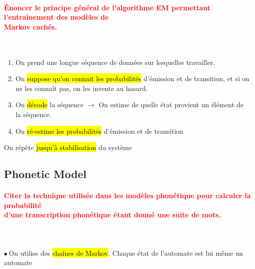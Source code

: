 \documentclass[letterpaper, 12pt]{article}
\newcommand{\alinea}{
\hspace*{0.3cm}}
\newcommand{\red}[1]{
	\textcolor{red}{#1}
}
\newcommand{\point}{$\bullet\ $}
\begin{document}
		\paragraph{\red{Énoncer le principe général de l'algorithme EM permettant l'entraînement des modèles de 
		~\\ \hspace*{0.035cm} Markov cachés.}}~\\
			\vspace*{-0.45cm}
			\begin{enumerate}
				\setlength{\itemsep}{0pt}		
				\setlength{\parskip}{0pt}		
				\setlength{\parsep}{0pt}	
				\item On prend une longue séquence de données sur lesquelles travailler.
				\item On \hl{suppose qu'on connait les probabilit\'es} d'émission et de transition, et si on ne les 
					connaît pas, on les invente au hasard.
				\item On \hl{d\'ecode} la séquence $\rightarrow$ On estime de quelle état provient un élément de la 
					séquence.
				\item On \hl{r\'e-estime les probabilit\'es} d'émission et de transition
			\end{enumerate}
			On répète \hl{jusqu'\`a stabilisation} du système
	\subsection{Phonetic Model}
		\paragraph{\red{Citer la technique utilisée dans les modèles phonétique pour calculer la probabilité 
		~\\ \hspace*{0.035cm} d'une transcription phonétique étant donné une suite de mots.}}~\\~\\
			\point On utilise des \hl{cha\^ines de Markov}. Chaque état de l'automate est lui même un automate 
				\\\alinea 
\end{document}
